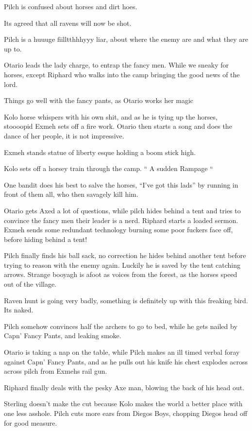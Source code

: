 Pilch is confused about horses and dirt hoes.    

Its agreed that all ravens will now be shot.    

Pilch is a huuuge fiilltthhhyyy liar, about where the enemy are and what they are up to.    

Otario leads the lady charge, to entrap the fancy men. While we sneaky for horses, except Riphard who walks into the camp bringing the good news of the lord.    

Things go well with the fancy pants, as Otario works her magic    

Kolo horse whispers with his own shit, and as he is tying up the horses, stoooopid Exmeh sets off a fire work. Otario then starts a song and does the dance of her people, it is not impressive.    

Exmeh stands statue of liberty esque holding a boom stick high.    

Kolo sets off a horsey train through the camp. “ A sudden Rampage “    

One bandit does his best to salve the horses, “I’ve got this lads” by running in front of them all, who then savagely kill him.    

Otario gets Axed a lot of questions, while pilch hides behind a tent and tries to convince the fancy men their leader is a nerd. Riphard starts a loaded sermon. Exmeh sends some redundant technology burning some poor fuckers face off, before hiding behind a tent!    

Pilch finally finds his ball sack, no correction he hides behind another tent before trying to reason with the enemy again. Luckily he is saved by the tent catching arrows. Strange booyagh is afoot as voices from the forest, as the horses speed out of the village.    

Raven hunt is going very badly, something is definitely up with this freaking bird. Its naked.    

Pilch somehow convinces half the archers to go to bed, while he gets nailed by Capn’ Fancy Pants, and leaking smoke.    

Otario is taking a nap on the table, while Pilch makes an ill timed verbal foray against Capn’ Fancy Pants, and as he pulls out his knife his chest explodes across across pilch from Exmehs rail gun.    

Riphard finally deals with the pesky Axe man, blowing the back of his head out.    

Sterling doesn’t make the cut because Kolo makes the world a better place with one less asshole. Pilch cuts more ears from Diegos Boys, chopping Diegos head off for good measure.    

